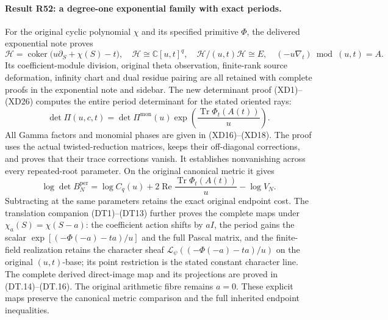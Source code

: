 \paragraph{Result R52: a degree-one exponential family with exact periods.}
For the original cyclic polynomial \(\chi\) and its specified primitive
\(\Phi\), the delivered exponential note proves
\[
 \mathcal H=\operatorname{coker}
 \bigl(u\partial_S+\chi(S)-t\bigr),\quad
 \mathcal H\cong\mathbb C[u,t]^q,\quad
 \mathcal H/(u,t)\mathcal H\cong E,
 \quad(-u\nabla_t)\bmod(u,t)=A.
\]
Its coefficient-module division, original theta observation,
finite-rank source deformation, infinity chart and dual residue
pairing are all retained with complete proofs in the exponential
note and sidebar. The new determinant proof (XD1)--(XD26) computes
the entire period determinant for the stated oriented rays:
\[
 \det\Pi(u,c,t)=\det\Pi^{\mathrm{mon}}(u)
       \exp\!\left(\frac{\operatorname{Tr}\Phi_t(A(t))}{u}\right).
\]
All Gamma factors and monomial phases are given in (XD16)--(XD18).
The proof uses the actual twisted-reduction matrices, keeps their
off-diagonal corrections, and proves that their trace corrections
vanish. It establishes nonvanishing across every repeated-root
parameter. On the original canonical metric it gives
\[
 \log\det B_N^{\mathrm{per}}=
 \log C_q(u)+2\operatorname{Re}
       \frac{\operatorname{Tr}\Phi_t(A(t))}{u}-\log V_N.
\]
Subtracting at the same parameters retains the exact original
endpoint cost. The translation companion (DT1)--(DT13) further
proves the complete maps under \(\chi_a(S)=\chi(S-a)\): the
coefficient action shifts by \(aI\), the period gains the scalar
\(\exp[(-\Phi(-a)-ta)/u]\) and the full Pascal matrix, and the
finite-field realization retains the character sheaf
\(\mathcal L_\psi((-\Phi(-a)-ta)/u)\) on the original
\((u,t)\)-base; its point restriction is the stated constant
character line. The complete derived direct-image map and
its projections are proved in (DT.14)--(DT.16). The original arithmetic fibre
remains \(a=0\). These explicit maps preserve the canonical metric
comparison and the full inherited endpoint inequalities.

